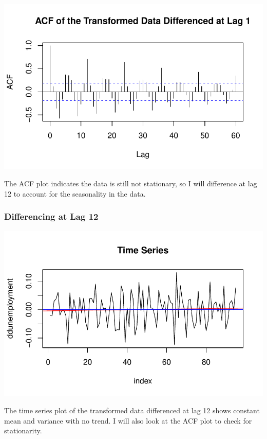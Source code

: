 \documentclass[
  letterpaper,
  DIV=11,
  numbers=noendperiod]{scrartcl}
\begin{document}
\includegraphics{Final_Project_files/figure-pdf/unnamed-chunk-12-1.pdf}

The ACF plot indicates the data is still not stationary, so I will
difference at lag 12 to account for the seasonality in the data.

\hypertarget{differencing-at-lag-12}{%
\subsubsection{Differencing at Lag 12}\label{differencing-at-lag-12}}

\includegraphics{Final_Project_files/figure-pdf/unnamed-chunk-13-1.pdf}

The time series plot of the transformed data differenced at lag 12 shows
constant mean and variance with no trend. I will also look at the ACF
plot to check for stationarity.
\end{document}
